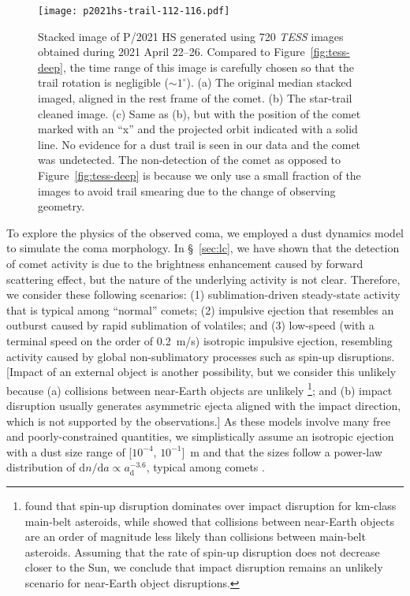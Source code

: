 \documentclass[modern]{aastex631}
\begin{document}
\begin{CJK*}{UTF8}{gbsn}
\begin{figure*}
\begin{center}
\texttt{[image: p2021hs-trail-112-116.pdf]}
\caption{Stacked image of P/2021 HS generated using 720 {\it TESS} images obtained during 2021 April 22--26. Compared to Figure~\ref{fig:tess-deep}, the time range of this image is carefully chosen so that the trail rotation is negligible ($\sim1^\circ$). (a) The original median stacked imaged, aligned in the rest frame of the comet. (b) The star-trail cleaned image.  (c) Same as (b), but with the position of the comet marked with an ``x'' and the projected orbit indicated with a solid line. No evidence for a dust trail is seen in our data and the comet was undetected. The non-detection of the comet as opposed to Figure~\ref{fig:tess-deep} is because we only use a small fraction of the images to avoid trail smearing due to the change of observing geometry. \label{fig:tess}}
\end{center}
\end{figure*}

To explore the physics of the observed coma, we employed a dust dynamics model to simulate the coma morphology. In \S~\ref{sec:lc}, we have shown that the detection of comet activity is due to the brightness enhancement caused by forward scattering effect, but the nature of the underlying activity is not clear. Therefore, we consider these following scenarios: (1) sublimation-driven steady-state activity that is typical among ``normal'' comets; (2) impulsive ejection that resembles an outburst caused by rapid sublimation of volatiles; and (3) low-speed (with a terminal speed on the order of 0.2~m/s) isotropic impulsive ejection, resembling activity caused by global non-sublimatory processes such as spin-up disruptions. [Impact of an external object is another possibility, but we consider this unlikely because (a) collisions between near-Earth objects are unlikely \citep{Bottke1993}\footnote{\citet{Marzari2011} found that spin-up disruption dominates over impact disruption for km-class main-belt asteroids, while \citet{Bottke1993} showed that collisions between near-Earth objects are an order of magnitude less likely than collisions between main-belt asteroids. Assuming that the rate of spin-up disruption does not decrease closer to the Sun, we conclude that impact disruption remains an unlikely scenario for near-Earth object disruptions.}; and (b) impact disruption usually generates asymmetric ejecta aligned with the impact direction, which is not supported by the observations.] As these models involve many free and poorly-constrained quantities, we simplistically assume an isotropic ejection with a dust size range of [$10^{-4}$, $10^{-1}$]~m and that the sizes follow a power-law distribution of $\mathrm{d}n/\mathrm{d}a\propto a_\mathrm{d}^{-3.6}$, typical among comets \citep{Fulle2004}.


\end{CJK*}
\end{document}
